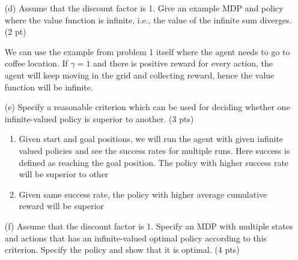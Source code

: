 \documentclass[12pt]{article}
\begin{document}
\begin{itemize}

\item[(d)] Assume that the discount factor is 1.  Give an example MDP and policy where the value function is infinite, i.e., the value of the infinite sum diverges. (2 pt)

\begin{solution} 
We can use the example from problem 1 itself where the agent needs to go to coffee location. If $\gamma = 1$ and there is  positive reward for every action, the agent will keep moving in the grid and collecting reward, hence the value function will be infinite.
\end{solution}

\item[(e)] Specify a reasonable criterion which can be used for deciding whether one infinite-valued policy is superior to another. (3  pts)

\begin{solution}
\begin{enumerate}
\item Given start and goal positions, we will run the agent with given infinite valued policies and see the success rates for multiple runs. Here success is defined as reaching the goal position. The policy with higher success rate will be superior to other
\item Given same success rate, the policy with higher average cumulative reward will be superior
\end{enumerate}
\end{solution}

\item[(f)] Assume that the discount factor is 1. Specify an MDP with multiple states and actions that has an infinite-valued optimal policy according to this criterion. Specify the policy and show that it is optimal. (4 pts)


\end{itemize}
\end{document}
